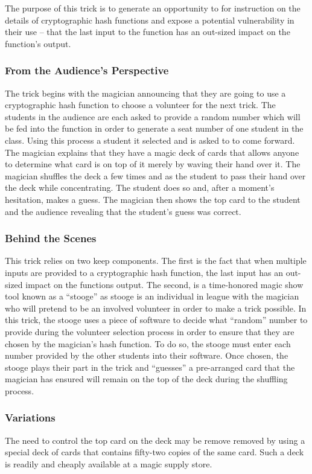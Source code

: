 The purpose of this trick is to generate an opportunity to for instruction on
the details of cryptographic hash functions and expose a potential vulnerability
in their use -- that the last input to the function has an out-sized impact on
the function's output.


\subsubsection{From the Audience's Perspective}

The trick begins with the magician announcing that they are going to use a
cryptographic hash function to choose a volunteer for the next trick.  The
students in the audience are each asked to provide a random number which will be
fed into the function in order to generate a seat number of one student in the
class.  Using this process a student it selected and is asked to to come
forward.  The magician explains that they have a magic deck of cards that allows
anyone to determine what card is on top of it merely by waving their hand over
it.  The magician shuffles the deck a few times and as the student to pass their
hand over the deck while concentrating.  The student does so and, after a
moment's hesitation, makes a guess.  The magician then shows the top card to the
student and the audience revealing that the student's guess was correct.

\subsubsection{Behind the Scenes}

This trick relies on two keep components.  The first is the fact that when
multiple inputs are provided to a cryptographic hash function, the last input
has an out-sized impact on the functions output.  The second, is a time-honored
magic show tool known as a ``stooge'' as stooge is an individual in league with
the magician who will pretend to be an involved volunteer in order to make a
trick possible.  In this trick, the stooge uses a piece of software to decide
what ``random'' number to provide during the volunteer selection process in
order to ensure that they are chosen by the magician's hash function.  To do so,
the stooge must enter each number provided by the other students into their
software.  Once chosen, the stooge plays their part in the trick and ``guesses''
a pre-arranged card that the magician has ensured will remain on the top of the
deck during the shuffling process.

\subsubsection{Variations}

The need to control the top card on the deck may be remove removed by using a
special deck of cards that contains fifty-two copies of the same card.  Such a
deck is readily and cheaply available at a magic supply store.


